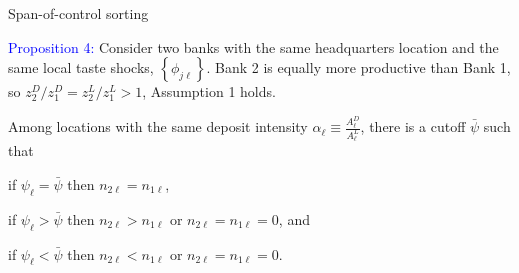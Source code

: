 \documentclass[notes,10pt, aspectratio=169]{beamer}
\newenvironment{wideitemize}{\itemize\addtolength{\itemsep}{10pt}}{\enditemize}
\begin{document}
\begin{frame}{Span-of-control sorting}

    \begin{wideitemize}

        \item \textcolor{blue}{Proposition 4:} Consider two banks with the same headquarters location and the same local taste shocks, $\left\{\phi_{j \ell}\right\}$. Bank 2 is equally more productive than Bank 1, so $z_2^D / z_1^D=z_2^L / z_1^L>1$, Assumption 1 holds. 
        
        Among locations with the same deposit intensity $\alpha_{\ell} \equiv \frac{A_{\ell}^D}{A_{\ell}^L}$, there is a cutoff $\bar{\psi}$ such that 

        \begin{wideitemize}
            \item if $\psi_{\ell}=\bar{\psi}$ then $n_{2 \ell}=n_{1 \ell}$,
            \item if $\psi_{\ell}>\bar{\psi}$ then $n_{2 \ell}>n_{1 \ell}$ or $n_{2 \ell}=n_{1 \ell}=0$, and
            \item if $\psi_{\ell}<\bar{\psi}$ then $n_{2 \ell}<n_{1 \ell}$ or $n_{2 \ell}=n_{1 \ell}=0$.

        \end{wideitemize}

    \end{wideitemize}

\end{frame}
\end{document}
